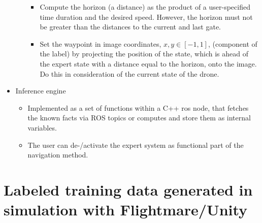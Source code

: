\begin{itemize}
\begin{itemize}
\begin{itemize}
			\item Compute the horizon (a distance) as the product of a user-specified time duration and the desired speed. 
			However, the horizon must not be greater than the distances to the current and last gate.
			\item Set the waypoint in image coordinates, $x, y \in [-1, 1]$, (component of the label) by projecting the position of the state,
			which is ahead of the expert state with a distance equal to the horizon, onto the image. 
			Do this in consideration of the current state of the drone.
		\end{itemize}
	\end{itemize} 
	\item Inference engine
	\begin{itemize}
		\item Implemented as a set of functions within a C++ ros node, that fetches the known facts via ROS topics or computes and store them as internal variables.
		\item The user can de-/activate the expert system as functional part of the navigation method.
	\end{itemize} 
\end{itemize}







\section{Labeled training data generated in simulation with Flightmare/Unity}\label{sec:GazeboTrainingData}


